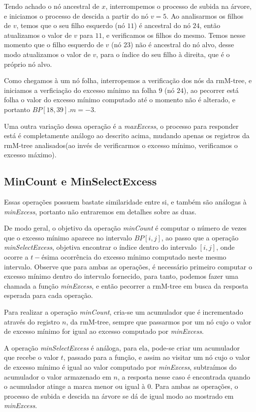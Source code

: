 \begin{example}
        Tendo achado o nó ancestral de $x$, interrompemos o processo de subida na árvore, e iniciamos o processo de descida  a partir do nó $v=5$. Ao analisarmos os filhos de $v$, temos que o seu filho esquerdo (nó $11$) é ancestral do nó $24$, então atualizamos o valor de $v$ para $11$, e verificamos os filhos do mesmo. Temos nesse momento que o filho esquerdo de $v$ (nó $23$) não é ancestral do nó alvo, desse modo atualizamos o valor de $v$, para o índice do seu filho à direita, que é o próprio nó alvo.

        Como chegamos à um nó folha, interropemos a verificação dos nós da rmM-tree, e iniciamos a verficiação do excesso mínimo na folha $9$ (nó $24$), ao pecorrer está folha o valor do excesso mínimo computado até o momento não é alterado, e portanto $BP[18,39].m=-3$.
    \end{example}

        
        Uma outra variação dessa operação é a \textit{maxExcess}, o processo para responder está é completamente análogo ao descrito acima, mudando apenas os registros da rmM-tree analisados(ao invés de verificarmos o excesso mínimo, verificamos o excesso máximo).

    \subsection{MinCount e MinSelectExcess}
    Essas operações possuem bastate similaridade entre si, e também são análogas à \textit{minExcess}, portanto não entraremos em  detalhes sobre as duas. 
    
    De modo geral, o objetivo da operação \textit{minCount} é computar o número de vezes que o excesso mínimo aparece no intervalo $BP[i,j]$, ao passo que a operação \textit{minSelectExcess}, 
    objetiva encontrar o índice dentro do intervalo $[i,j]$, onde ocorre a $t-$ésima ocorrência do excesso mínimo computado neste mesmo intervalo. 
    Observe que para ambas as operações, é necessário primeiro computar o excesso mínimo dentro do intervalo fornecido, para tanto, podemos fazer uma chamada a função \textit{minExcess}, 
    e então pecorrer a rmM-tree em busca da resposta esperada para cada operação. 
    
    Para realizar a operação \textit{minCount}, cria-se um acumulador que é incrementado através do registro $n$, da rmM-tree, sempre que passarmos por um nó cujo o valor de excesso mínimo for igual ao excesso computado por \textit{minExcess}. 

    A operação \textit{minSelectExcess} é análoga, para ela, pode-se criar um acumulador que recebe o valor $t$, passado para a função, e assim ao visitar um nó cujo o valor de excesso mínimo é igual ao valor computado por \textit{minExcess}, subtraímos do acumulador  o valor armazenado em $n$, a resposta nesse caso é encontrada quando o acumulador atinge a marca menor ou igual à $0$. Para ambas as operações, o processo de subida e descida na árvore se dá de igual modo ao mostrado em \textit{minExcess}.


